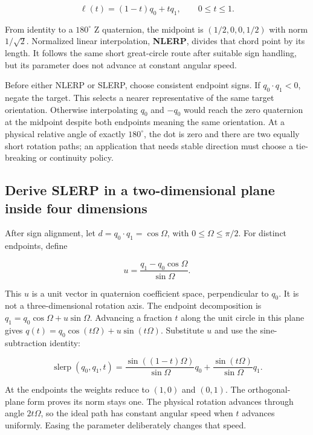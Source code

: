 \[
\ell(t)=(1-t)q_0+tq_1,\qquad 0\le t\le1.
\]

From identity to a \(180^\circ\) Z quaternion, the midpoint is \((1/2,0,0,1/2)\) with norm \(1/\sqrt2\). Normalized linear interpolation, \textbf{NLERP}, divides that chord point by its length. It follows the same short great-circle route after suitable sign handling, but its parameter does not advance at constant angular speed.

Before either NLERP or SLERP, choose consistent endpoint signs. If \(q_0\cdot q_1<0\), negate the target. This selects a nearer representative of the same target orientation. Otherwise interpolating \(q_0\) and \(-q_0\) would reach the zero quaternion at the midpoint despite both endpoints meaning the same orientation. At a physical relative angle of exactly \(180^\circ\), the dot is zero and there are two equally short rotation paths; an application that needs stable direction must choose a tie-breaking or continuity policy.

\subsection{Derive SLERP in a two-dimensional plane inside four dimensions}\label{01-foundations-i-ch019-derive-slerp-in-a-two-dimensional-plane-inside-four-dimensions}

\hypertarget{01-foundations-i-ch019-derive-slerp-in-a-two-dimensional-plane-inside-four-dimensions}{}

After sign alignment, let \(d=q_0\cdot q_1=\cos\Omega\), with \(0\le\Omega\le\pi/2\). For distinct endpoints, define

\[
u=\frac{q_1-q_0\cos\Omega}{\sin\Omega}.
\]

This \(u\) is a unit vector in quaternion coefficient space, perpendicular to \(q_0\). It is not a three-dimensional rotation axis. The endpoint decomposition is \(q_1=q_0\cos\Omega+u\sin\Omega\). Advancing a fraction \(t\) along the unit circle in this plane gives \(q(t)=q_0\cos(t\Omega)+u\sin(t\Omega)\). Substitute \(u\) and use the sine-subtraction identity:

\[
\operatorname{slerp}(q_0,q_1,t)=
\frac{\sin((1-t)\Omega)}{\sin\Omega}q_0
+\frac{\sin(t\Omega)}{\sin\Omega}q_1.
\]

At the endpoints the weights reduce to \((1,0)\) and \((0,1)\). The orthogonal-plane form proves its norm stays one. The physical rotation advances through angle \(2t\Omega\), so the ideal path has constant angular speed when \(t\) advances uniformly. Easing the parameter deliberately changes that speed.

